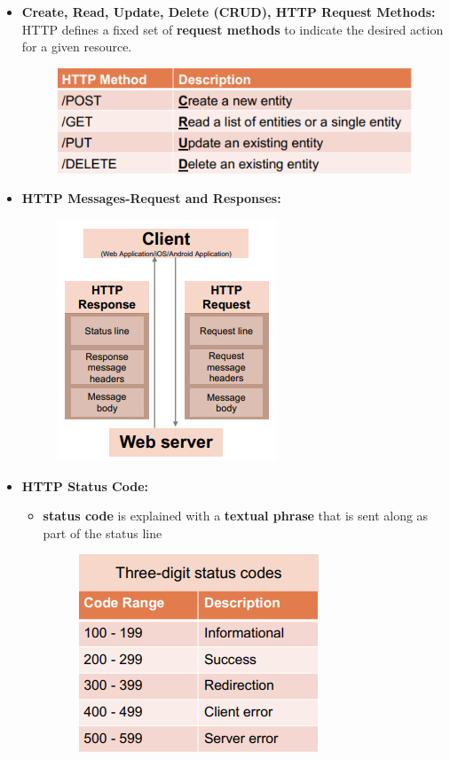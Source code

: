 \documentclass[ieeetran]{article}
\begin{document}
\begin{itemize}
\item \textbf{Create, Read, Update, Delete (CRUD), HTTP Request Methods:} HTTP defines a fixed set of \textbf{request methods} to indicate the desired action for a given resource.
	\begin{figure}[h!]
	  \centering
	  \includegraphics[width=0.5\linewidth]{httpmethods.png}
	  \label{fig:httpmethods_png}
	\end{figure}

\item \textbf{HTTP Messages-Request and Responses:}
	\begin{figure}[h!]
	  \centering
	  \includegraphics[width=0.4\linewidth]{httpmessages.png}
	  \label{fig:httpmessages_png}
	\end{figure}

\pagebreak

\item \textbf{HTTP Status Code:}
	\begin{itemize}
	  \item \textbf{status code} is explained with a \textbf{textual phrase} that is sent along as part of the status line
\begin{figure}[h!]
  \centering
  \includegraphics[width=0.3\linewidth]{httpstatuscodes.png}
  \label{fig:httpstatuscodes_png}
\end{figure}	
	\end{itemize}


\end{itemize}
\end{document}
